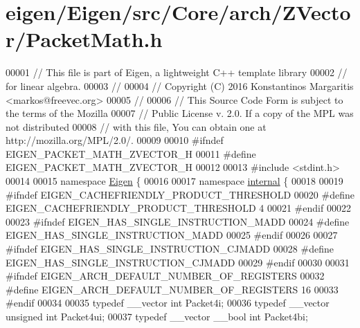 \hypertarget{eigen_2_eigen_2src_2_core_2arch_2_z_vector_2_packet_math_8h_source}{}\section{eigen/\+Eigen/src/\+Core/arch/\+Z\+Vector/\+Packet\+Math.h}
\label{eigen_2_eigen_2src_2_core_2arch_2_z_vector_2_packet_math_8h_source}

\begin{DoxyCode}
00001 \textcolor{comment}{// This file is part of Eigen, a lightweight C++ template library}
00002 \textcolor{comment}{// for linear algebra.}
00003 \textcolor{comment}{//}
00004 \textcolor{comment}{// Copyright (C) 2016 Konstantinos Margaritis <markos@freevec.org>}
00005 \textcolor{comment}{//}
00006 \textcolor{comment}{// This Source Code Form is subject to the terms of the Mozilla}
00007 \textcolor{comment}{// Public License v. 2.0. If a copy of the MPL was not distributed}
00008 \textcolor{comment}{// with this file, You can obtain one at http://mozilla.org/MPL/2.0/.}
00009 
00010 \textcolor{preprocessor}{#ifndef EIGEN\_PACKET\_MATH\_ZVECTOR\_H}
00011 \textcolor{preprocessor}{#define EIGEN\_PACKET\_MATH\_ZVECTOR\_H}
00012 
00013 \textcolor{preprocessor}{#include <stdint.h>}
00014 
00015 \textcolor{keyword}{namespace }\hyperlink{namespace_eigen}{Eigen} \{
00016 
00017 \textcolor{keyword}{namespace }\hyperlink{namespaceinternal}{internal} \{
00018 
00019 \textcolor{preprocessor}{#ifndef EIGEN\_CACHEFRIENDLY\_PRODUCT\_THRESHOLD}
00020 \textcolor{preprocessor}{#define EIGEN\_CACHEFRIENDLY\_PRODUCT\_THRESHOLD 4}
00021 \textcolor{preprocessor}{#endif}
00022 
00023 \textcolor{preprocessor}{#ifndef EIGEN\_HAS\_SINGLE\_INSTRUCTION\_MADD}
00024 \textcolor{preprocessor}{#define EIGEN\_HAS\_SINGLE\_INSTRUCTION\_MADD}
00025 \textcolor{preprocessor}{#endif}
00026 
00027 \textcolor{preprocessor}{#ifndef EIGEN\_HAS\_SINGLE\_INSTRUCTION\_CJMADD}
00028 \textcolor{preprocessor}{#define EIGEN\_HAS\_SINGLE\_INSTRUCTION\_CJMADD}
00029 \textcolor{preprocessor}{#endif}
00030 
00031 \textcolor{preprocessor}{#ifndef EIGEN\_ARCH\_DEFAULT\_NUMBER\_OF\_REGISTERS}
00032 \textcolor{preprocessor}{#define EIGEN\_ARCH\_DEFAULT\_NUMBER\_OF\_REGISTERS  16}
00033 \textcolor{preprocessor}{#endif}
00034 
00035 \textcolor{keyword}{typedef} \_\_vector \textcolor{keywordtype}{int}                 Packet4i;
00036 \textcolor{keyword}{typedef} \_\_vector \textcolor{keywordtype}{unsigned} \textcolor{keywordtype}{int}        Packet4ui;
00037 \textcolor{keyword}{typedef} \_\_vector \_\_bool \textcolor{keywordtype}{int}          Packet4bi;

\end{DoxyCode}

